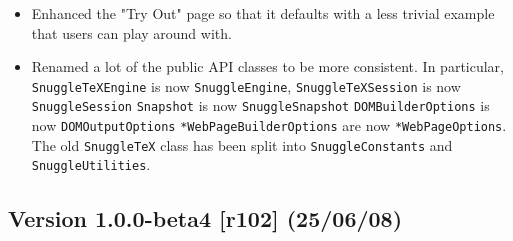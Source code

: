 \begin{itemize}
  \item Enhanced the "Try Out" page so that it defaults with a less trivial
  example that users can play around with.

  \item Renamed a lot of the public API classes to be more consistent. In
  particular, \verb|SnuggleTeXEngine| is now \verb|SnuggleEngine|,
  \verb|SnuggleTeXSession| is now \verb|SnuggleSession|
  \verb|Snapshot| is now \verb|SnuggleSnapshot|
  \verb|DOMBuilderOptions| is now \verb|DOMOutputOptions|
  \verb|*WebPageBuilderOptions| are now \verb|*WebPageOptions|.
  The old \verb|SnuggleTeX| class has been split into \verb|SnuggleConstants|
  and \verb|SnuggleUtilities|.

\end{itemize}

\subsection*{Version 1.0.0-beta4 [r102] (25/06/08)}

